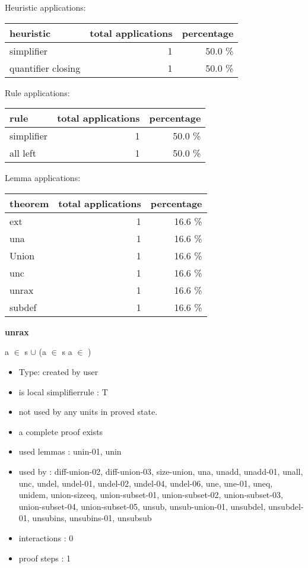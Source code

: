 \documentclass[a4paper]{article}
\begin{document}
\medskip


Heuristic applications:

\begin{supertabular}{l|r|r}
heuristic	& total applications & percentage \\ \hline
simplifier & 1 & 50.0 \% \\
quantifier closing & 1 & 50.0 \% \\

\end{supertabular}

Rule applications:

\begin{supertabular}{l|r|r}
rule	        & total applications & percentage \\ \hline
simplifier & 1 & 50.0 \% \\
all left & 1 & 50.0 \% \\

\end{supertabular}

Lemma applications:

\begin{supertabular}{l|r|r}
theorem	        & total applications & percentage \\ \hline
ext & 1 & 16.6 \% \\
una & 1 & 16.6 \% \\
Union & 1 & 16.6 \% \\
unc & 1 & 16.6 \% \\
unrax & 1 & 16.6 \% \\
subdef & 1 & 16.6 \% \\

\end{supertabular}
\pagebreak

{\LARGE\bf unrax}\label{lemma-unrax}

\medskip

 \Fol a $\in$ s $\cup$  \Equiv \Not \Not (a $\in$ s \Or a $\in$ )

\begin{itemize}

\item Type: created by user

\item is local simplifierrule : T
\item not used by any units in proved state.
\item       a complete proof exists
\item       used lemmas  : unin-01, unin
\item       used by      : diff-union-02, diff-union-03, size-union, una, unadd, unadd-01, unall, unc, undel, undel-01, undel-02, undel-04, undel-06, une, une-01, uneq, unidem, union-sizeeq, union-subset-01, union-subset-02, union-subset-03, union-subset-04, union-subset-05, unsub, unsub-union-01, unsubdel, unsubdel-01, unsubins, unsubins-01, unsubsub
\item       interactions : 0
\item       proof steps  : 1
\end{itemize}
\end{document}
